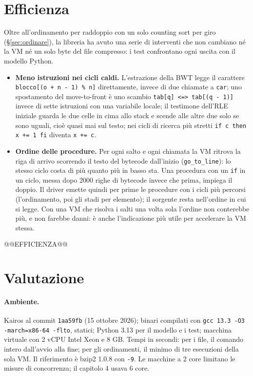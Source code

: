 \documentclass[11pt,a4paper]{article}
\newcommand{\kw}[1]{\texttt{#1}}
\begin{document}
\section{Efficienza}
\label{sec:efficienza}

Oltre all'ordinamento per raddoppio con un solo counting sort per giro (§\ref{sec:ordinare}), la libreria ha avuto una serie di interventi che non cambiano né la VM né un solo byte del file compresso: i test confrontano ogni uscita con il modello Python.

\begin{itemize}
\item \textbf{Meno istruzioni nei cicli caldi.} L'estrazione della BWT legge il carattere \kw{blocco[(o + n - 1) \% n]} direttamente, invece di due chiamate a \kw{car}; uno spostamento del move-to-front è uno scambio \kw{tab[q] <=> tab[(q - 1)]} invece di sette istruzioni con una variabile locale; il testimone dell'RLE iniziale guarda le due celle in cima allo stack e scende alle altre due solo se sono uguali, cioè quasi mai sul testo; nei cicli di ricerca più stretti \kw{if c then x += 1 fi} diventa \kw{x += c}.
\item \textbf{Ordine delle procedure.} Per ogni salto e ogni chiamata la VM ritrova la riga di arrivo scorrendo il testo del bytecode dall'inizio (\kw{go\_to\_line}): lo stesso ciclo costa di più quanto più in basso sta. Una procedura con un \kw{if} in un ciclo, messa dopo 2000 righe di bytecode invece che prima, impiega il doppio. Il driver emette quindi per prime le procedure con i cicli più percorsi (l'ordinamento, poi gli stadi per elemento); il sorgente resta nell'ordine in cui si legge. Con una VM che risolva i salti una volta sola l'ordine non conterebbe più, e non farebbe danni: è anche l'indicazione più utile per accelerare la VM stessa.
\end{itemize}

@@EFFICIENZA@@

\section{Valutazione}
\label{sec:valutazione}

\paragraph{Ambiente.} Kairos al commit \kw{1aa59fb} (15 ottobre 2026); binari compilati con \kw{gcc 13.3 -O3 -march=x86-64 -flto}, statici; Python 3.13 per il modello e i test; macchina virtuale con 2 vCPU Intel Xeon e 8 GB. Tempi in secondi: per i file, il comando intero dall'avvio alla fine; per gli ordinamenti, il minimo di tre esecuzioni della sola VM. Il riferimento è bzip2 1.0.8 con \kw{-9}. Le macchine a 2 core limitano le misure di concorrenza; il capitolo 4 usava 6 core.
\end{document}
